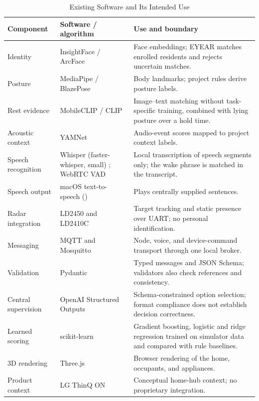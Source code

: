\documentclass[conference]{IEEEtran}
\newcommand{\fld}[1]{\texttt{\detokenize{#1}}}
\begin{document}
\begin{table}[!t]
\caption{Existing Software and Its Intended Use}
\label{tab:software}
\centering
\small
\begin{tabularx}{\textwidth}{
@{}L{0.17\textwidth}L{0.25\textwidth}Y@{}
}
\toprule
\textbf{Component} & \textbf{Software / algorithm}
& \textbf{Use and boundary} \\
\midrule
Identity
& InsightFace / ArcFace \cite{arcface}
& Face embeddings; EYEAR matches enrolled residents and
rejects uncertain matches. \\

Posture
& MediaPipe / BlazePose \cite{mediapipe,blazepose}
& Body landmarks; project rules derive posture labels. \\

Rest evidence
& MobileCLIP / CLIP \cite{mobileclip,clip}
& Image--text matching without task-specific training,
combined with lying posture over a hold time. \\

Acoustic context
& YAMNet \cite{yamnet}
& Audio-event scores mapped to project context labels. \\

Speech recognition
& Whisper (faster-whisper, small) \cite{whisper}; WebRTC VAD
& Local transcription of speech segments only; the wake phrase is
matched in the transcript. \\

Speech output
& macOS text-to-speech (\fld{say})
& Plays centrally supplied sentences. \\

Radar integration
& LD2450 and LD2410C \cite{esphome_ld2450,hlk_ld2410c}
& Target tracking and static presence over UART;
no personal identification. \\

Messaging
& MQTT and Mosquitto \cite{mqtt,mosquitto}
& Node, voice, and device-command transport through one local broker. \\

Validation
& Pydantic \cite{pydantic}
& Typed messages and JSON Schema; validators also check
references and consistency. \\

Central supervision
& OpenAI Structured Outputs \cite{openai_struct}
& Schema-constrained option selection; format compliance
does not establish decision correctness. \\

Learned scoring
& scikit-learn \cite{sklearn}
& Gradient boosting, logistic and ridge regression trained on
simulator data and compared with rule baselines. \\

3D rendering
& Three.js
& Browser rendering of the home, occupants, and appliances. \\

Product context
& LG ThinQ ON \cite{lg2024}
& Conceptual home-hub context; no proprietary integration. \\
\bottomrule
\end{tabularx}
\end{table}
\end{document}
